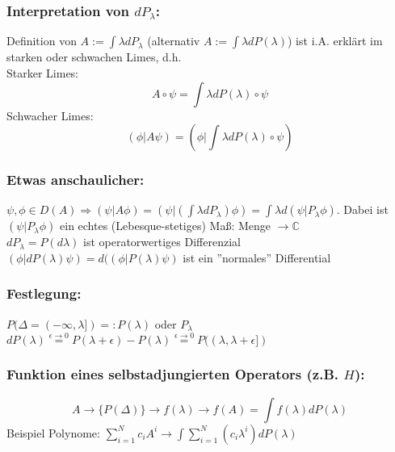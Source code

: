 \documentclass[twoside,a4paper]{scrartcl}
\newcommand{\C}{\mathbb{C}}
\renewcommand{\1}{\mathds{1}}
\newcommand{\Ra}{\Rightarrow}
\newcommand{\ra}{\rightarrow}
\renewcommand{\C}{\mathbb{C}}
\begin{document}
\subsubsection*{Interpretation von $dP_\lambda$:}
Definition von $A:=\int \lambda dP_\lambda$ (alternativ $A:=\int \lambda dP(\lambda)$) ist i.A. erklärt im starken oder schwachen Limes, d.h. \\
Starker Limes:
$$A \circ \psi=\int \lambda dP(\lambda)\circ \psi$$
Schwacher Limes:
$$(\phi| A \psi)=(\phi|\int \lambda dP(\lambda)\circ \psi)$$

\subsubsection*{Etwas anschaulicher:}
$\psi, \phi \in D(A) \Ra (\psi|A\phi)=(\psi|(\int \lambda dP_\lambda)\phi)=\int \lambda d(\psi|P_\lambda \phi)$. Dabei ist $(\psi|P_\lambda \phi)$ ein echtes (Lebesque-stetiges) Maß: Menge $\ra \C$\\
$dP_\lambda=P(d\lambda)$ ist operatorwertiges Differenzial\\
$(\phi| dP(\lambda)\psi)=d((\phi| P(\lambda)\psi)$ ist ein ''normales'' Differential

\subsubsection*{Festlegung:}
$P(\Delta=(-\infty, \lambda])=:P(\lambda)$ oder $P_\lambda$\\
$dP(\lambda)\stackrel{\epsilon \ra 0}{=} P(\lambda+\epsilon)-P(\lambda)\stackrel{\epsilon \ra 0}{=} P((\lambda,\lambda+\epsilon])$

\subsubsection*{Funktion eines selbstadjungierten Operators (z.B. $H$):}
$$A \ra \{P(\Delta)\}\ra f(\lambda) \ra f(A)=\int f(\lambda)dP(\lambda)$$
Beispiel Polynome: $\sum_{i=1}^N c_i A^i\ra  \int \sum_{i=1}^N (c_i \lambda^i)dP(\lambda)$
\end{document}
